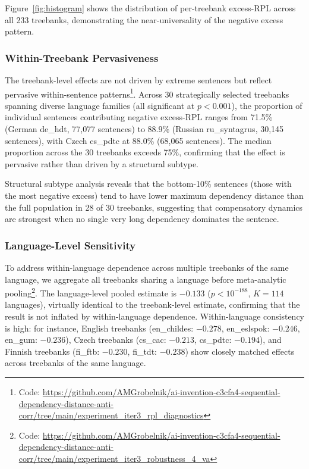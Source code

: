 \documentclass[11pt,letterpaper]{article}
\begin{document}
Figure~\ref{fig:histogram} shows the distribution of per-treebank excess-RPL across all 233 treebanks, demonstrating the near-universality of the negative excess pattern.

\subsubsection{Within-Treebank Pervasiveness}

The treebank-level effects are not driven by extreme sentences but reflect pervasive within-sentence patterns\footnote{Code: \url{https://github.com/AMGrobelnik/ai-invention-c3cfa4-sequential-dependency-distance-anti-corr/tree/main/experiment_iter3_rpl_diagnostics}}. Across 30 strategically selected treebanks spanning diverse language families (all significant at $p < 0.001$), the proportion of individual sentences contributing negative excess-RPL ranges from 71.5\% (German de\_hdt, 77,077 sentences) to 88.9\% (Russian ru\_syntagrus, 30,145 sentences), with Czech cs\_pdtc at 88.0\% (68,065 sentences). The median proportion across the 30 treebanks exceeds 75\%, confirming that the effect is pervasive rather than driven by a structural subtype.

Structural subtype analysis reveals that the bottom-10\% sentences (those with the most negative excess) tend to have lower maximum dependency distance than the full population in 28 of 30 treebanks, suggesting that compensatory dynamics are strongest when no single very long dependency dominates the sentence.

\subsubsection{Language-Level Sensitivity}

To address within-language dependence across multiple treebanks of the same language, we aggregate all treebanks sharing a language before meta-analytic pooling\footnote{Code: \url{https://github.com/AMGrobelnik/ai-invention-c3cfa4-sequential-dependency-distance-anti-corr/tree/main/experiment_iter3_robustness_4_va}}. The language-level pooled estimate is $-0.133$ ($p < 10^{-188}$, $K = 114$ languages), virtually identical to the treebank-level estimate, confirming that the result is not inflated by within-language dependence. Within-language consistency is high: for instance, English treebanks (en\_childes: $-0.278$, en\_eslspok: $-0.246$, en\_gum: $-0.236$), Czech treebanks (cs\_cac: $-0.213$, cs\_pdtc: $-0.194$), and Finnish treebanks (fi\_ftb: $-0.230$, fi\_tdt: $-0.238$) show closely matched effects across treebanks of the same language.
\end{document}
